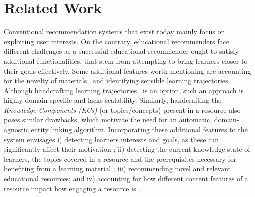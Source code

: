 \documentclass[letterpaper]{article} %
\begin{document}




\section{Related Work} \label{topic:related_work}

Conventional recommendation systems that exist today mainly focus on exploiting user interests. On the contrary, educational recommenders face different challenges as a successful educational recommender ought to satisfy additional functionalities, that stem from attempting to bring learners closer to their goals effectively. Some
additional features worth mentioning are accounting for the novelty of materials~\cite{Drachsler:edurec} and identifying sensible learning trajectories.
Although handcrafting learning trajectories~\cite{bauman2018recommending} is an option, such an approach is highly domain specific and lacks scalability. Similarly, handcrafting the \emph{Knowledge Components (KCs)} (or topics/concepts) present in a resource also poses similar drawbacks, which motivate the need for an automatic, domain-agnostic entity linking algorithm.
Incorporating these additional features to the system envisages i) detecting learners interests and goals, as these can significantly affect their motivation \cite{Salehi2014}; ii) detecting the current knowledge state of learners, the topics covered in a resource and the prerequisites necessary for benefiting from a learning material \cite{bauman2018recommending}; iii) recommending novel and relevant educational resources; and iv) accounting for how different content features of a resource impact how engaging a resource is
\cite{quality_features,Guo_vid_prod}.
\end{document}
